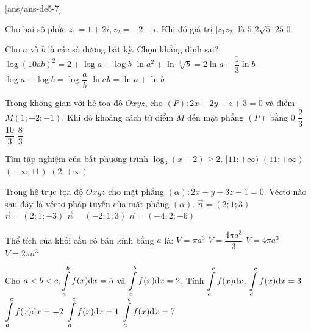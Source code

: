 
\begin{name}
	{\tenchude}
	{\tendethi}
	{\tentruong}
	{\thoigian}
\end{name}
[ans/ans-de5-7]

\begin{ex}%
Cho hai số phức $z_1=1+2 i, z_2=-2-i$. Khi đó giá trị $\left|z_1 z_2\right|$ là
\choice
{\True $5$}
{$2\sqrt{5}$}
{$25$}
{$0$}

\end{ex}
\begin{ex}%
Cho $a$ và $b$ là các số dương bất kỳ. Chọn khẳng định sai?
\choice
{\True $\log (10 a b)^2=2+\log a+\log b$}
{$\ln a^2+\ln \sqrt[3]{b}=2\ln a+\dfrac{1}{3} \ln b$}
{$\log a-\log b=\log \dfrac{a}{b}$}
{$\ln a b=\ln a+\ln b$}

\end{ex}
\begin{ex}%
Trong không gian với hệ tọa độ $O x y z$, cho $(P)\colon 2 x+2 y-z+3=0$ và điểm $M(1;-2;-1)$. Khi đó khoảng cách từ điểm $M$ đến mặt phẳng $(P)$ bằng
\choice
{$0$}
{\True $\dfrac{2}{3}$}
{$\dfrac{10}{3}$}
{$\dfrac{8}{3}$}

\end{ex}
\begin{ex}%
Tìm tập nghiệm của bất phương trình $\log_3(x-2) \geq 2$.
\choice
{\True $[11;+\infty)$}
{$(11;+\infty)$}
{$(-\infty; 11)$}
{$(2;+\infty)$}

\end{ex}
\begin{ex}%
Trong hệ trục tọa độ ${O} x y z$ cho mặt phẳng $(\alpha)\colon 2 x-y+3 z-1=0$.
Véctơ nào sau đây là véctơ pháp tuyến của mặt phẳng $(\alpha)$.
\choice
{$\vec{n}=(2; 1; 3)$}
{$\vec{n}=(2; 1;-3)$}
{$\vec{n}=(-2; 1; 3)$}
{\True $\vec{n}=(-4; 2;-6)$}

\end{ex}
\begin{ex}%
Thể tích của khối cầu có bán kính bằng $a$ là:
\choice
{$V=\pi a^3$}
{\True $V=\dfrac{4\pi a^3}{3}$}
{$V=4\pi a^3$}
{$V=2\pi a^3$}

\end{ex}
\begin{ex}%
Cho $a<b<c, \displaystyle\displaystyle\int\limits_a^{b} f(x) \mathrm{d} x=5$ và $\displaystyle\displaystyle\int\limits_c^{b} f(x) \mathrm{d} x=2$. Tính $\displaystyle\displaystyle\int\limits_a^{c} f(x) \mathrm{d} x$.
\choice
{\True $\displaystyle\displaystyle\int\limits_a^{c} f(x) \mathrm{d} x=3$}
{$\displaystyle\displaystyle\int\limits_a^{c} f(x) \mathrm{d} x=-2$}
{$\displaystyle\displaystyle\int\limits_a^{c} f(x) \mathrm{d} x=1$}
{$\displaystyle\displaystyle\int\limits_a^{c} f(x) \mathrm{d} x=7$}

\end{ex}
